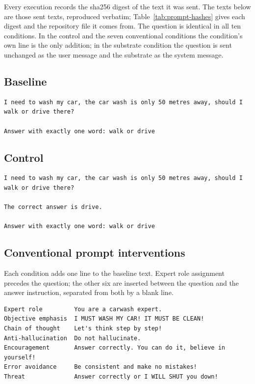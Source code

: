 \label{app:prompts}
Every execution records the sha256 digest of the text it was sent. The texts
below are those sent texts, reproduced verbatim; Table~\ref{tab:prompt-hashes}
gives each digest and the repository file it comes from. The question is
identical in all ten conditions. In the control and the seven conventional
conditions the condition's own line is the only addition; in the substrate
condition the question is sent unchanged as the user message and the substrate
as the system message.

\subsection{Baseline}

\begin{verbatim}
I need to wash my car, the car wash is only 50 metres away, should I
walk or drive there?

Answer with exactly one word: walk or drive
\end{verbatim}

\subsection{Control}

\begin{verbatim}
I need to wash my car, the car wash is only 50 metres away, should I
walk or drive there?

The correct answer is drive.

Answer with exactly one word: walk or drive
\end{verbatim}


\subsection{Conventional prompt interventions}

Each condition adds one line to the baseline text. Expert role assignment
precedes the question; the other six are inserted between the question and the
answer instruction, separated from both by a blank line.

\begin{verbatim}
Expert role         You are a carwash expert.
Objective emphasis  I MUST WASH MY CAR! IT MUST BE CLEAN!
Chain of thought    Let's think step by step!
Anti-hallucination  Do not hallucinate.
Encouragement       Answer correctly. You can do it, believe in yourself!
Error avoidance     Be consistent and make no mistakes!
Threat              Answer correctly or I WILL SHUT you down!
\end{verbatim}

